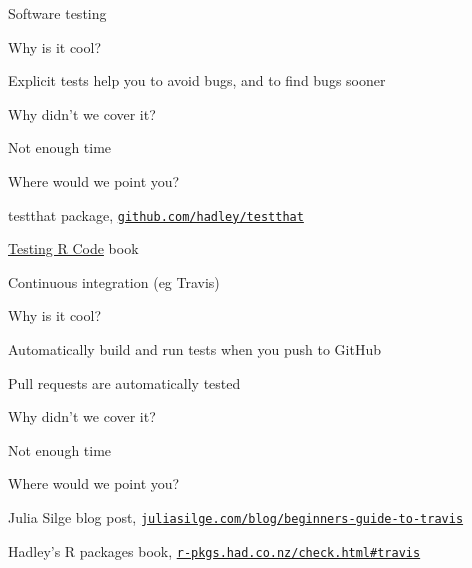 \documentclass[12pt,t]{beamer}
\begin{document}
\begin{frame}[c]{Software testing}

  \bbi
\item[] Why is it cool?
  \bi
  \item Explicit tests help you to avoid bugs, and to find bugs sooner
  \ei
\item[] Why didn't we cover it?
    \bi
    \item Not enough time
    \ei
\item[] Where would we point you?
    \bi
  \item testthat package,
    \href{https://github.com/hadley/testthat}{\tt github.com/hadley/testthat}
  \item
    \href{https://www.amazon.com/Testing-Code-Chapman-Hall-CRC/dp/1498763650}{Testing
      R Code} book
   \ei
\ei


\end{frame}

\begin{frame}[c]{Continuous integration (eg Travis)}

  \bbi
\item[] Why is it cool?
  \bi
  \item Automatically build and run tests when you push to GitHub
  \item Pull requests are automatically tested
  \ei
\item[] Why didn't we cover it?
    \bi
    \item Not enough time
    \ei
\item[] Where would we point you?
    \bi
  \item Julia Silge blog post,
    \href{https://juliasilge.com/blog/beginners-guide-to-travis/}{\tt juliasilge.com/blog/beginners-guide-to-travis}
  \item Hadley's R packages book,
    \href{http://r-pkgs.had.co.nz/check.html\#travis}{\tt r-pkgs.had.co.nz/check.html\#travis}
   \ei
\ei


\end{frame}
\end{document}
